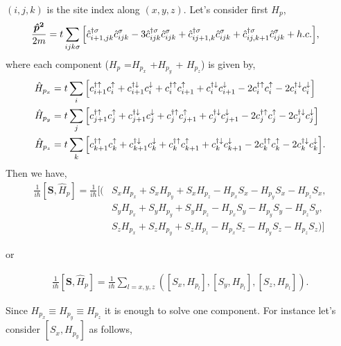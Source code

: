 \documentclass[10pt,prb,showpacs,amssymb,floatfix]{revtex4-1}
\newcommand{\dn}{\downarrow}
\newcommand{\nn}{\nonumber}
\newcommand{\upa}{\uparrow}
\newcommand{\sg}{\sigma}
\newcommand{\h}{\hat}
\begin{document}
$(i,j,k)$ is the site index along $(x,y,z)$. Let's consider first $H_p$,
\begin{align}
\frac{\bm{\h p^2}}{2m} &= t\sum_{ijk\sg}  \Big{[} \hat{c}_{i+1,jk}^{\dagger \sigma} \hat{c}^\sigma_{ijk} - 3\hat{c}_{ijk}^{\dagger \sigma} \hat{c}^\sigma_{ijk} + \hat{c}_{ij+1,k}^{\dagger \sigma} \hat{c}^\sigma_{ijk} + \hat{c}_{ij,k+1}^{\dagger \sigma} \hat{c}^\sigma_{ijk} + h.c.   \Big{]}, 
\end{align}
where each component ($H_p$ =$H_{p_x}$ +$H_{p_y}$ + $H_{p_z}$) is given by,
\begin{align}
\h H_{p_x} &=  t \sum_{i}  \Big{[} c_{i+1}^{\dagger \upa} c_{i}^\upa + c_{i+1}^{\dagger \dn} c_{i}^\dn  +c_{i}^{\dagger \upa} c_{i+1}^\upa + c_{i}^{\dagger \dn} c_{i+1}^\dn  - 2 c_{i}^{\dagger \upa} c_{i}^\upa   - 2 c_{i}^{\dagger \dn} c_{i}^\dn  \Big{]} \\
\h H_{p_y} &=  t \sum_{j}  \Big{[} c_{j+1}^{\dagger \upa} c_{j}^\upa + c_{j+1}^{\dagger \dn} c_{j}^\dn  +c_{j}^{\dagger \upa} c_{j+1}^\upa + c_{j}^{\dagger \dn} c_{j+1}^\dn  - 2 c_{j}^{\dagger \upa} c_{j}^\upa   - 2 c_{j}^{\dagger \dn} c_{j}^\dn  \Big{]} \\
\h H_{p_z} &=  t \sum_{k}  \Big{[} c_{k+1}^{\dagger \upa} c_{k}^\upa + c_{k+1}^{\dagger \dn} c_{k}^\dn  +c_{k}^{\dagger \upa} c_{k+1}^\upa + c_{k}^{\dagger \dn} c_{k+1}^\dn  - 2 c_{k}^{\dagger \upa} c_{k}^\upa   - 2 c_{k}^{\dagger \dn} c_{k}^\dn  \Big{]}.
\label{1Dhpxooend}
\end{align}
Then we have,
\begin{align}
\frac{1}{i\hbar}[\bm S, \h H_p] =  \frac{1}{i\hbar}[(&S_x H_{p_x} + S_x H_{p_y} + S_x H_{p_z} -H_{p_x}S_x - H_{p_y}S_x - H_{p_z}S_x , \nn\\
    &S_y H_{p_x} + S_y H_{p_y} + S_y H_{p_z} -H_{p_x}S_y - H_{p_y}S_y - H_{p_z}S_y,  \nn\\
    &S_z H_{p_x} + S_z H_{p_y} + S_z H_{p_z} -H_{p_x}S_z - H_{p_y}S_z - H_{p_z}S_z)]
\end{align}

or

\begin{align}
\frac{1}{i\hbar}[\bm S, \h H_p] =  \frac{1}{i\hbar}\sum_{l = x,y,z}([S_x, H_{p_l}], 
    [S_y, H_{p_l}],  
    [S_z, H_{p_l}] ).
\end{align}

Since $H_{p_x} \equiv H_{p_y} \equiv H_{p_z}$ it is enough to solve one component. For instance let's consider $[S_x,H_{p_y}]$ as follows,
\end{document}
